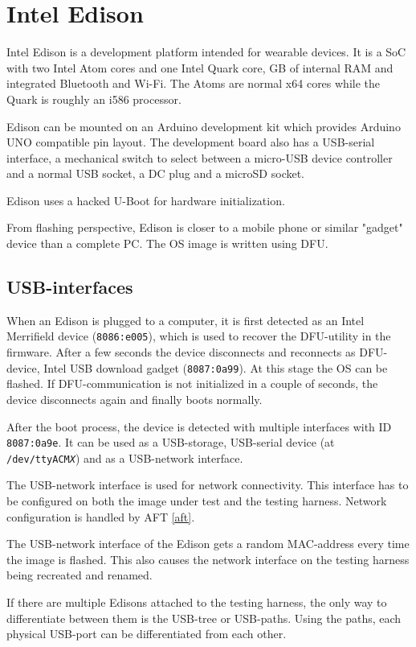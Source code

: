 \documentclass[a4paper,11pt]{article}
\newcommand{\cmd}[1]{\texttt{#1}}
\begin{document}
\section{Intel Edison}
\label{edison}

Intel Edison is a development platform intended for wearable devices. It is a SoC with two Intel Atom cores and one Intel Quark core, GB of internal RAM and integrated Bluetooth and Wi-Fi. The Atoms are normal x64 cores while the Quark is roughly an i586 processor.

Edison can be mounted on an Arduino development kit which provides Arduino UNO compatible pin layout. The development board also has a USB-serial interface, a mechanical switch to select between a micro-USB device controller  and a normal USB socket, a DC plug and a microSD socket.

Edison uses a hacked U-Boot for hardware initialization. 

From flashing perspective, Edison is closer to a mobile phone or similar "gadget" device than a complete PC. The OS image is written using DFU.

\subsection{USB-interfaces}

When an Edison is plugged to a computer, it is first detected as an Intel Merrifield device (\cmd{8086:e005}), which is used to recover the DFU-utility in the firmware. After a few seconds the device disconnects and reconnects as DFU-device, Intel USB download gadget (\cmd{8087:0a99}).  At this stage the OS can be flashed. If DFU-communication is not initialized in a couple of seconds, the device disconnects again and finally boots normally. 

After the boot process, the device is detected with multiple interfaces with ID \cmd{8087:0a9e}. It can be used as a USB-storage, USB-serial device (at \cmd{/dev/ttyACM\textit{X}}) and as a USB-network interface.

The USB-network interface is used for network connectivity. This interface has to be configured on both the image under test and the testing harness. Network configuration is handled by AFT \ref{aft}.

The USB-network interface of the Edison gets a random MAC-address every time the image is flashed. This also causes the network interface on the testing harness being recreated and renamed.

If there are multiple Edisons attached to the testing harness, the only way to differentiate between them is the USB-tree or USB-paths. Using the paths, each physical USB-port can be differentiated from each other.
\end{document}
